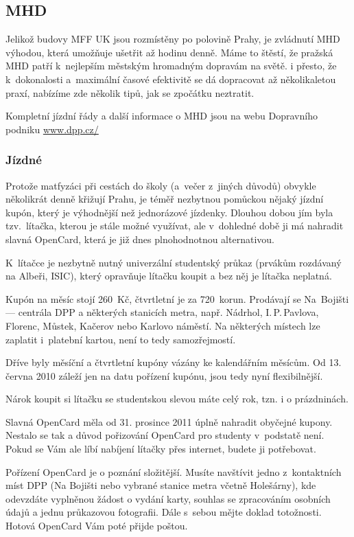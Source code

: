 \subsection{MHD}

Jelikož budovy MFF UK jsou rozmístěny po polovině Prahy, je
zvládnutí MHD výhodou, která umožňuje ušetřit až hodinu denně.
Máme to štěstí, že pražská MHD patří k~nejlepším městským
hromadným dopravám na světě. i přesto, že k~dokonalosti
a~maximální časové efektivitě se dá dopracovat až několikaletou
praxí, nabízíme zde několik tipů, jak se zpočátku neztratit.


Kompletní jízdní řády a další informace o MHD jsou na webu
Dopravního podniku \url{www.dpp.cz/}

\subsubsection{Jízdné}

Protože matfyzáci při cestách do školy (a~večer z~jiných důvodů)
obvykle několikrát denně křižují Prahu, je téměř nezbytnou
pomůckou nějaký jízdní kupón, který je výhodnější než jednorázové
jízdenky. Dlouhou dobou jím byla tzv.~lítačka, kterou je stále
možné využívat, ale v~dohledné době ji má nahradit slavná
OpenCard, která je již dnes plnohodnotnou alternativou.

K~lítačce je nezbytně nutný univerzální studentský průkaz
(prvákům rozdávaný na Albeři, ISIC), který opravňuje lítačku
koupit a bez něj je lítačka neplatná. 

Kupón na měsíc stojí 260~Kč, čtvrtletní je za 720~korun.
Prodávají se Na~Bojišti --- centrála DPP a některých stanicích
metra, např. Nádrhol, I.$\,$P.$\,$Pavlova, Florenc, Můstek,
Kačerov nebo Karlovo náměstí. Na některých místech lze zaplatit
i~platební kartou, není to tedy samozřejmostí.

Dříve byly měsíční a čtvrtletní kupóny vázány ke kalendářním
měsícům. Od 13. června 2010 záleží jen na datu pořízení kupónu,
jsou tedy nyní flexibilnější.

Nárok koupit si lítačku se studentskou slevou máte celý rok,
tzn. i o prázdninách.


Slavná OpenCard měla od 31. prosince 2011 úplně nahradit obyčejné kupony. Nestalo se tak a důvod pořizování OpenCard pro studenty v~podstatě není. Pokud se Vám ale líbí nabíjení lítačky přes internet, budete ji potřebovat.

Pořízení OpenCard je o poznání složitější. Musíte navštívit jedno z~kontaktních míst DPP (Na Bojišti nebo vybrané stanice metra včetně Holešárny), kde odevzdáte vyplněnou žádost o vydání karty, souhlas se zpracováním osobních údajů a jednu průkazovou fotografii. Dále s~sebou mějte doklad totožnosti. Hotová OpenCard Vám poté přijde poštou.

